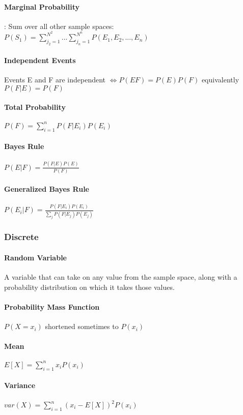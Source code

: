 \paragraph{Marginal Probability}: Sum over all other sample spaces:
$P(S_1) = \sum_{j_2=1}^{N^2}...\sum_{j_n=1}^{N^n} P(E_1 , E_2  , ... , E_n ) $

\paragraph{Independent Events} Events E and F are independent 
$\iff P(EF) = P(E)P(F)$ equivalently $P(F|E) = P(F)$

\paragraph{Total Probability} $P(F) = \sum_{i=1}^n P(F | E_i )P(E_i)$

\paragraph{Bayes Rule} $P(E|F)=\frac{P(F|E)P(E)}{P(F)}$
\paragraph{Generalized Bayes Rule}
$P(E_i|F)=\frac{P(F|E_i)P(E_i)}{\sum_{j} P(F|E_j)P(E_j)}$


\subsubsection{Discrete}
\paragraph{Random Variable} A variable that can take on any value from the
sample space, along with a probability distribution on which it takes those
values.
\paragraph{Probability Mass Function} $P(X=x_i)$ shortened sometimes to $P(x_i)$
\paragraph{Mean} $E[X] = \sum_{i=1}^n x_i P(x_i)$
\paragraph{Variance} $var(X) = \sum_{i=1}^n (x_i - E[X])^2P(x_i)$
